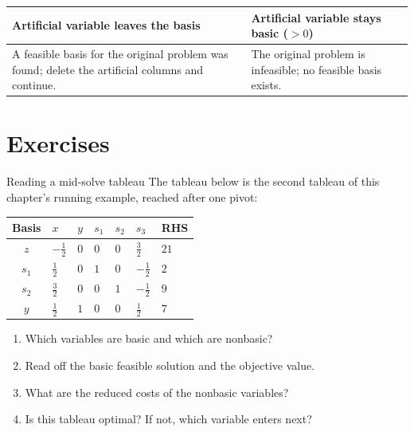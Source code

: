 \begin{center}
\renewcommand{\arraystretch}{1.3}
\begin{tabular}{@{}p{}p{}@{}}
\toprule
\textbf{Artificial variable leaves the basis} & \textbf{Artificial variable stays basic ($>0$)}\\
\midrule
A feasible basis for the original problem was found; delete the artificial columns and continue. & The original problem is infeasible; no feasible basis exists.\\
\bottomrule
\end{tabular}
\end{center}

\section{Exercises}


\begin{ex}{Reading a mid-solve tableau}{}
\label{ex:tableau-read-mid}
 The tableau below is the second tableau of this chapter's running example, reached after one pivot:
\begin{center}
\renewcommand{\arraystretch}{1.3}
\begin{tabular}{c|ZZZZZ|Z}
\toprule
Basis & $x$ & $y$ & $s_1$ & $s_2$ & $s_3$ & RHS\\
\midrule
$z$   & $-\tfrac12$ & $0$ & $0$ & $0$ & $\tfrac32$ & $21$\\
\midrule
$s_1$ & $\tfrac12$ & $0$ & $1$ & $0$ & $-\tfrac12$ & $2$\\
$s_2$ & $\tfrac32$ & $0$ & $0$ & $1$ & $-\tfrac12$ & $9$\\
$y$   & $\tfrac12$ & $1$ & $0$ & $0$ & $\tfrac12$ & $7$\\
\bottomrule
\end{tabular}
\end{center}
\begin{enumerate}
    \item Which variables are basic and which are nonbasic?
    \item Read off the basic feasible solution and the objective value.
    \item What are the reduced costs of the nonbasic variables?
    \item Is this tableau optimal?  If not, which variable enters next?
\end{enumerate}
\end{ex}

